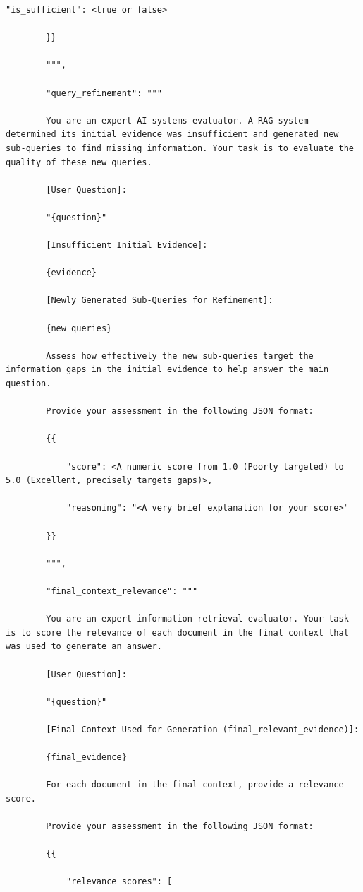 \documentclass[11pt]{article}
\begin{document}
\begin{lstlisting}[basicstyle=\scriptsize\ttfamily]
        "is_sufficient": <true or false>

        }}

        """,

        "query_refinement": """

        You are an expert AI systems evaluator. A RAG system determined its initial evidence was insufficient and generated new sub-queries to find missing information. Your task is to evaluate the quality of these new queries.

        [User Question]:

        "{question}"

        [Insufficient Initial Evidence]:

        {evidence}

        [Newly Generated Sub-Queries for Refinement]:

        {new_queries}

        Assess how effectively the new sub-queries target the information gaps in the initial evidence to help answer the main question.

        Provide your assessment in the following JSON format:

        {{

            "score": <A numeric score from 1.0 (Poorly targeted) to 5.0 (Excellent, precisely targets gaps)>,

            "reasoning": "<A very brief explanation for your score>"

        }}

        """,

        "final_context_relevance": """

        You are an expert information retrieval evaluator. Your task is to score the relevance of each document in the final context that was used to generate an answer.

        [User Question]:

        "{question}"

        [Final Context Used for Generation (final_relevant_evidence)]:

        {final_evidence}

        For each document in the final context, provide a relevance score.

        Provide your assessment in the following JSON format:

        {{

            "relevance_scores": [


\end{lstlisting}
\end{document}
